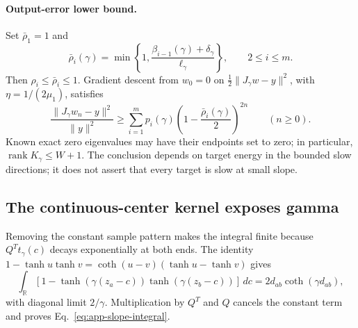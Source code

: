 \paragraph{Output-error lower bound.}
Set $\bar\rho_1=1$ and
\begin{equation}
 \bar\rho_i(\gamma)=\min\left\{1,
 \frac{\beta_{i-1}(\gamma)+\delta_\gamma}{\ell_\gamma}\right\},
 \qquad 2\le i\le m.
 \label{eq:app-slope-upper-rates}
\end{equation}
Then $\rho_i\le\bar\rho_i\le1$. Gradient descent from $w_0=0$ on
$\frac12\|J_\gamma w-y\|^2$, with $\eta=1/(2\mu_1)$, satisfies
\begin{equation}
 \frac{\|J_\gamma w_n-y\|^2}{\|y\|^2}
 \ge\sum_{i=1}^m p_i(\gamma)
 \left(1-\frac{\bar\rho_i(\gamma)}2\right)^{2n}
 \qquad(n\ge0).
 \label{eq:app-slope-output-bound}
\end{equation}
Known exact zero eigenvalues may have their endpoints set to zero; in
particular, $\operatorname{rank}K_\gamma\le W+1$. The conclusion depends on
target energy in the bounded slow directions; it does not assert that every
target is slow at small slope.

\subsection{The continuous-center kernel exposes gamma}
Removing the constant sample pattern makes the integral finite because
$Q^Tt_\gamma(c)$ decays exponentially at both ends. The identity
$1-\tanh u\tanh v=\coth(u-v)(\tanh u-\tanh v)$ gives
\begin{equation}
 \int_{\mathbb R}[1-\tanh(\gamma(z_a-c))\tanh(\gamma(z_b-c))]\,dc
 =2d_{ab}\coth(\gamma d_{ab}),
\end{equation}
with diagonal limit $2/\gamma$. Multiplication by $Q^T$ and $Q$ cancels the
constant term and proves Eq.~\eqref{eq:app-slope-integral}.

